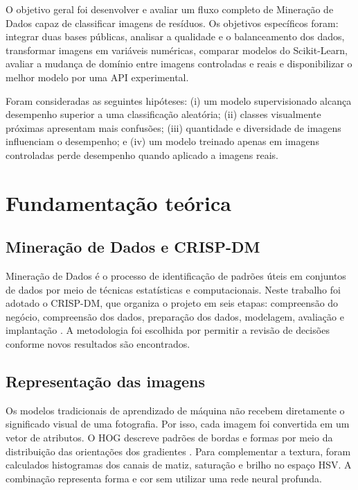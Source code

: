 \documentclass[11pt,a4paper]{article}
\begin{document}
O objetivo geral foi desenvolver e avaliar um fluxo completo de Mineração de Dados capaz de classificar imagens de resíduos. Os objetivos específicos foram: integrar duas bases públicas, analisar a qualidade e o balanceamento dos dados, transformar imagens em variáveis numéricas, comparar modelos do Scikit-Learn, avaliar a mudança de domínio entre imagens controladas e reais e disponibilizar o melhor modelo por uma API experimental.

Foram consideradas as seguintes hipóteses: (i) um modelo supervisionado alcança desempenho superior a uma classificação aleatória; (ii) classes visualmente próximas apresentam mais confusões; (iii) quantidade e diversidade de imagens influenciam o desempenho; e (iv) um modelo treinado apenas em imagens controladas perde desempenho quando aplicado a imagens reais.

\section{Fundamentação teórica}

\subsection{Mineração de Dados e CRISP-DM}

Mineração de Dados é o processo de identificação de padrões úteis em conjuntos de dados por meio de técnicas estatísticas e computacionais. Neste trabalho foi adotado o CRISP-DM, que organiza o projeto em seis etapas: compreensão do negócio, compreensão dos dados, preparação dos dados, modelagem, avaliação e implantação \cite{wirth2000crisp}. A metodologia foi escolhida por permitir a revisão de decisões conforme novos resultados são encontrados.

\subsection{Representação das imagens}

Os modelos tradicionais de aprendizado de máquina não recebem diretamente o significado visual de uma fotografia. Por isso, cada imagem foi convertida em um vetor de atributos. O HOG descreve padrões de bordas e formas por meio da distribuição das orientações dos gradientes \cite{dalal2005hog}. Para complementar a textura, foram calculados histogramas dos canais de matiz, saturação e brilho no espaço HSV. A combinação representa forma e cor sem utilizar uma rede neural profunda.
\end{document}
